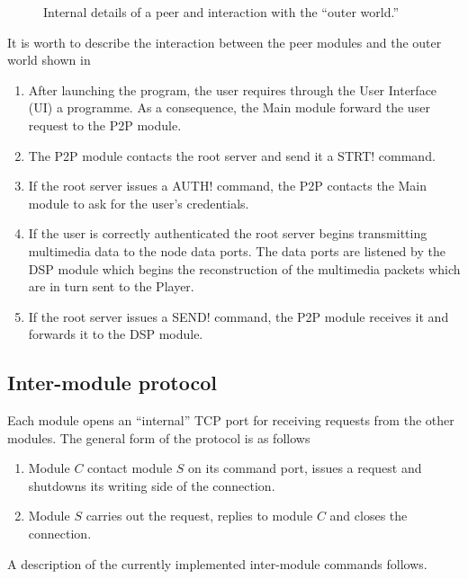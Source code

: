 \documentclass{medusabook}
\begin{document}
\begin{figure}
\centerline{}
\caption{Internal details of a peer and interaction with the ``outer
  world.'' 
\label{fig:peer-internal}}
\end{figure}
%

\begin{commento}
It is worth to describe  the interaction between the peer modules and
the outer world  shown in 
\begin{enumerate}
\item
After launching the program, the user requires through the User
Interface (UI) a programme.  As a consequence, the Main module
forward the user request to the P2P module.
\item
The P2P module contacts the root server and send it a \ttt STRT!
command.  
\item
If the root server issues a \ttt AUTH! command, the P2P contacts the
Main module to ask for the user's credentials.
\item
If the user is correctly authenticated the root server begins
transmitting multimedia data to the node data ports.  The data ports
are listened by the DSP module which begins the reconstruction of the
multimedia packets which are in turn sent to the Player.
\item
If the root server issues a \ttt SEND! command, the P2P module
receives it and forwards it to the DSP module.
\end{enumerate}
%
\end{commento}

\subsection{Inter-module protocol}
\label{sect:2.2;medusa_book}

Each module opens an ``internal'' TCP port for receiving requests from
the other modules.  The general form of the protocol is as follows

\begin{enumerate}
\item
Module $C$ contact module $S$ on its command port, issues a
request and shutdowns its writing side of the connection.
\item
Module $S$ carries out the request, replies to module $C$ and closes
the connection.
\end{enumerate}
%
A description of the currently implemented inter-module commands
follows. 
\end{document}
